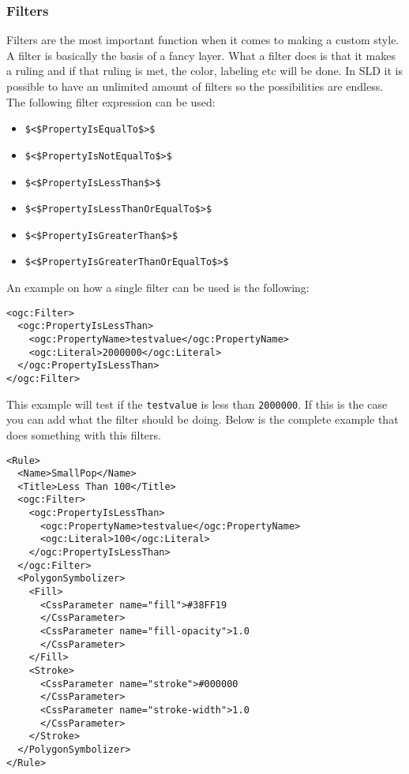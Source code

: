 \subsubsection{Filters}

Filters are the most important function when it comes to making a custom style. A filter is basically the basis of a fancy layer. What a filter does is that it makes a ruling and if that ruling is met, the color, labeling etc will be done. In SLD it is possible to have an unlimited amount of filters so the possibilities are endless. The following filter expression can be used:

\begin{itemize}
	\item \lstinline|$<$PropertyIsEqualTo$>$|
	\item \lstinline|$<$PropertyIsNotEqualTo$>$|
	\item \lstinline|$<$PropertyIsLessThan$>$|
	\item \lstinline|$<$PropertyIsLessThanOrEqualTo$>$|
	\item \lstinline|$<$PropertyIsGreaterThan$>$|
	\item \lstinline|$<$PropertyIsGreaterThanOrEqualTo$>$|
\end{itemize}
An example on how a single filter can be used is the following:
\begin{lstlisting}
<ogc:Filter>
  <ogc:PropertyIsLessThan>
    <ogc:PropertyName>testvalue</ogc:PropertyName>
    <ogc:Literal>2000000</ogc:Literal>
  </ogc:PropertyIsLessThan>
</ogc:Filter>
\end{lstlisting}
This example will test if the \lstinline|testvalue| is less than \lstinline|2000000|. If this is the case you can add what the filter should be doing. Below is the complete example that does something with this filters.
\begin{lstlisting}
<Rule>
  <Name>SmallPop</Name>
  <Title>Less Than 100</Title>
  <ogc:Filter>
    <ogc:PropertyIsLessThan>
      <ogc:PropertyName>testvalue</ogc:PropertyName>
      <ogc:Literal>100</ogc:Literal>
    </ogc:PropertyIsLessThan>
  </ogc:Filter>
  <PolygonSymbolizer>
    <Fill>
      <CssParameter name="fill">#38FF19
      </CssParameter>
      <CssParameter name="fill-opacity">1.0
      </CssParameter>
    </Fill>
    <Stroke>
      <CssParameter name="stroke">#000000
      </CssParameter>
      <CssParameter name="stroke-width">1.0
      </CssParameter>
    </Stroke>
  </PolygonSymbolizer>
</Rule>
\end{lstlisting}

